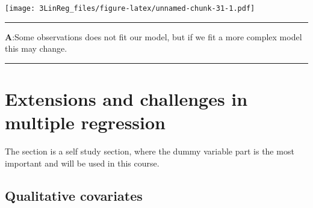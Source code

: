 \documentclass[]{article}
\newenvironment{Shaded}{\begin{snugshade}}{\end{snugshade}}
\newcommand{\DataTypeTok}[1]{\textcolor[rgb]{0.13,0.29,0.53}{#1}}
\newcommand{\FloatTok}[1]{\textcolor[rgb]{0.00,0.00,0.81}{#1}}
\newcommand{\KeywordTok}[1]{\textcolor[rgb]{0.13,0.29,0.53}{\textbf{#1}}}
\newcommand{\NormalTok}[1]{#1}
\newcommand{\OperatorTok}[1]{\textcolor[rgb]{0.81,0.36,0.00}{\textbf{#1}}}
\newcommand{\OtherTok}[1]{\textcolor[rgb]{0.56,0.35,0.01}{#1}}
\newcommand{\StringTok}[1]{\textcolor[rgb]{0.31,0.60,0.02}{#1}}
\begin{document}
\begin{Shaded}
\end{Shaded}

\texttt{[image: 3LinReg\_files/figure-latex/unnamed-chunk-31-1.pdf]}
\normalsize

\begin{center}\rule{0.5\linewidth}{\linethickness}\end{center}

\textbf{A}:Some observations does not fit our model, but if we fit a
more complex model this may change.

\begin{center}\rule{0.5\linewidth}{\linethickness}\end{center}

\hypertarget{extensions-and-challenges-in-multiple-regression}{%
\section{Extensions and challenges in multiple
regression}\label{extensions-and-challenges-in-multiple-regression}}

The section is a self study section, where the dummy variable part is
the most important and will be used in this course.

\hypertarget{qualitative-covariates}{%
\subsection{Qualitative covariates}\label{qualitative-covariates}}
\end{document}
